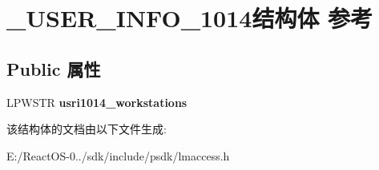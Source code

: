 \hypertarget{struct___u_s_e_r___i_n_f_o__1014}{}\section{\+\_\+\+U\+S\+E\+R\+\_\+\+I\+N\+F\+O\+\_\+1014结构体 参考}
\label{struct___u_s_e_r___i_n_f_o__1014}
\subsection*{Public 属性}
\begin{DoxyCompactItemize}
\item 
\mbox{\label{struct___u_s_e_r___i_n_f_o__1014_a4b9e43d60e7de1aa537749cbee3ca9d2}} 
L\+P\+W\+S\+TR {\bfseries usri1014\+\_\+workstations}
\end{DoxyCompactItemize}


该结构体的文档由以下文件生成\+:\begin{DoxyCompactItemize}
\item 
E\+:/\+React\+O\+S-\/0../sdk/include/psdk/lmaccess.\+h\end{DoxyCompactItemize}
